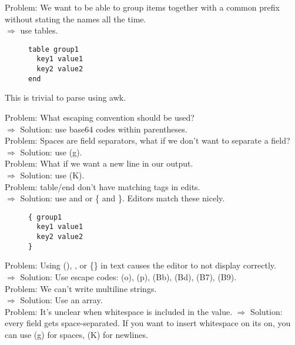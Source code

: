 \documentclass[listof=totoc]{article}
\begin{document}
\noindent Problem: We want to be able to group items together with a common prefix without stating the names all the time. \\
$\Rightarrow$ use tables.


\begin{figure}[H]
\centering
\begin{varwidth}{\linewidth}
\begin{verbatim}
table group1
  key1 value1
  key2 value2
end
\end{verbatim}
\end{varwidth}
\caption{}
\end{figure}

\noindent This is trivial to parse using awk.

\noindent Problem: What escaping convention should be used? \\
$\Rightarrow$ Solution: use base64 codes within parentheses. \\
Problem: Spaces are field separators, what if we don't want to separate a field? \\
$\Rightarrow$ Solution: use (g). \\
Problem: What if we want a new line in our output. \\
$\Rightarrow$ Solution: use (K). \\
Problem: table/end don't have matching tags in edits. \\
$\Rightarrow$ Solution: use \lbrack and \rbrack or \{ and \}. Editors match these nicely.


\begin{figure}[H]
\centering
\begin{varwidth}{\linewidth}
\begin{verbatim}
{ group1
  key1 value1
  key2 value2
}
\end{verbatim}
\end{varwidth}
\caption{}
\end{figure}

\noindent Problem: Using (), \lbrack \rbrack, or \{\} in text causes the editor to not display correctly. \\
$\Rightarrow$ Solution: Use escape codes: (o), (p), (Bb), (Bd), (B7), (B9). \\
\noindent Problem: We can't write multiline strings. \\
$\Rightarrow$ Solution: Use an array. \\
\noindent Problem: It's unclear when whitespace is included in the value.
$\Rightarrow$ Solution: every field gets space-separated. If you want to insert
whitespace on its on, you can use (g) for spaces, (K) for newlines.
\end{document}
